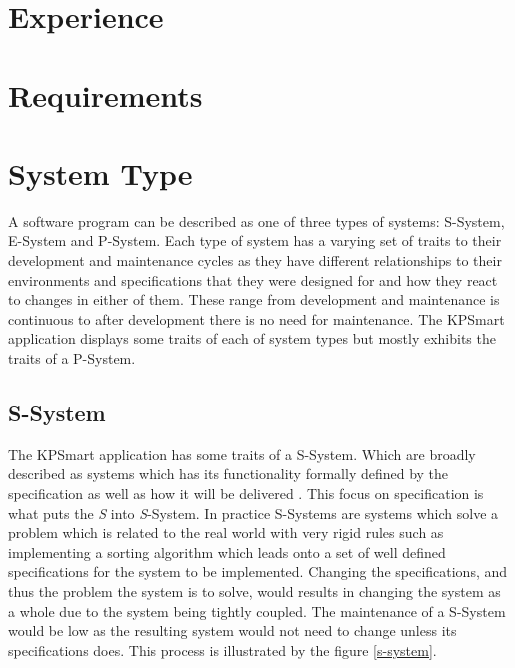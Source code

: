 \documentclass{style/CRPITStyle}
\renewcommand{\cite}{\citep}
\begin{document}
\section{Experience}


\section{Requirements}


\section{System Type}

A software program can be described as one of three types of systems:
S-System, E-System and P-System. Each type of system has a varying set of traits
to their development and maintenance cycles as they have different relationships
to their environments and specifications that they were designed for and how
they react to changes in either of them. These range from development
and maintenance is continuous to after development there is no need for
maintenance. The KPSmart application displays some traits of each of system
types but mostly exhibits the traits of a P-System.

\subsection{S-System}

The KPSmart application has some traits of a S-System. Which are broadly described as
systems which has its functionality formally defined by the specification as
well as how it will be delivered \cite{lehman:1980}.
This focus on specification is what puts the \emph{S} into \emph{S}-System.
In practice S-Systems are systems which solve a problem which is related to the real world
with very rigid rules such as implementing a sorting algorithm which leads onto a set of well defined
specifications for the system to be implemented.
Changing the specifications, and thus the problem the system is to solve,
would results in changing the system as a whole due to the system being tightly
coupled. The maintenance of a S-System would be low as the resulting system
would not need to change unless its specifications does.
This process is illustrated by the figure \ref{s-system}.
\end{document}
